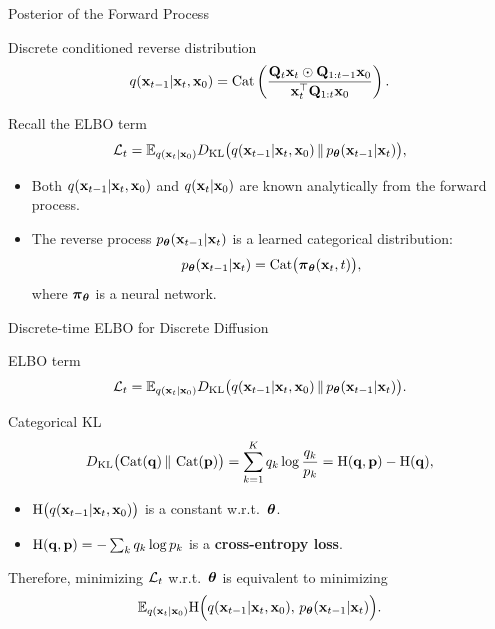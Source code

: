 \documentclass{beamer}
\begin{document}
\begin{frame}{Posterior of the Forward Process}
	\begin{block}{Discrete conditioned reverse distribution}
		\[
			q(\mathbf{x}_{t-1} | \mathbf{x}_t, \mathbf{x}_0)
			= \operatorname{Cat}\left(\frac{\mathbf{Q}_t \mathbf{x}_t \odot \mathbf{Q}_{1:t-1} \mathbf{x}_0}{\mathbf{x}_t^{\top}\mathbf{Q}_{1:t}\mathbf{x}_0}\right).
		\]
		\vspace{-0.3cm}
	\end{block}
	\eqpause
	Recall the ELBO term
	\[
		\mathcal{L}_t
		= \mathbb{E}_{q(\mathbf{x}_t | \mathbf{x}_0)}
		D_\mathrm{KL}\bigl(q(\mathbf{x}_{t-1} | \mathbf{x}_t, \mathbf{x}_0) \,\|\, p_{\boldsymbol{\theta}}(\mathbf{x}_{t-1} | \mathbf{x}_t)\bigr),
	\]
	\eqpause
	\vspace{-0.5cm}
	\begin{itemize}
		\item Both $q(\mathbf{x}_{t-1} | \mathbf{x}_t, \mathbf{x}_0)$ and $q(\mathbf{x}_t | \mathbf{x}_0)$ are known analytically from the forward process.
		\item The reverse process $p_{\boldsymbol{\theta}}(\mathbf{x}_{t-1} | \mathbf{x}_t)$ is a learned categorical distribution:
		\[
			p_{\boldsymbol{\theta}}(\mathbf{x}_{t-1} | \mathbf{x}_t) = \operatorname{Cat}\bigl( \boldsymbol{\pi}_{\boldsymbol{\theta}}(\mathbf{x}_t, t) \bigr),
		\]
		where $\boldsymbol{\pi}_{\boldsymbol{\theta}}$ is a neural network.
	\end{itemize}
\end{frame}
\begin{frame}{Discrete-time ELBO for Discrete Diffusion}

	\begin{block}{ELBO term}
		\vspace{-0.3cm}
		\[
			\mathcal{L}_t
			= \mathbb{E}_{q(\mathbf{x}_t | \mathbf{x}_0)}
			D_\mathrm{KL}\bigl(q(\mathbf{x}_{t-1} | \mathbf{x}_t, \mathbf{x}_0) \,\|\, p_{\boldsymbol{\theta}}(\mathbf{x}_{t-1} | \mathbf{x}_t)\bigr).
		\]
		\vspace{-0.3cm}
	\end{block}
	\eqpause
	\begin{block}{Categorical KL}
		\vspace{-0.3cm}
		\[
			D_\mathrm{KL}\bigl(\operatorname{Cat}(\mathbf{q}) \,\|\, \operatorname{Cat}(\mathbf{p})\bigr)
			= \sum_{k=1}^K q_k \log \frac{q_k}{p_k}
			= \mathrm{H}(\mathbf{q},\mathbf{p}) - \mathrm{H}(\mathbf{q}),
		\]
		\eqpause
		\begin{itemize}
			\item $\mathrm{H}\bigl(q(\mathbf{x}_{t-1} | \mathbf{x}_t, \mathbf{x}_0)\bigr)$ is a constant w.r.t.~$\boldsymbol{\theta}$.
			\item $\mathrm{H}(\mathbf{q},\mathbf{p}) = -\sum_k q_k \log p_k$ is a \textbf{cross-entropy loss}.
		\end{itemize}
	\end{block}
	\eqpause
	Therefore, minimizing $\mathcal{L}_t$ w.r.t.~$\boldsymbol{\theta}$ is equivalent to minimizing
	\[
		\mathbb{E}_{q(\mathbf{x}_t | \mathbf{x}_0)}
		\mathrm{H}\Bigl(q(\mathbf{x}_{t-1} | \mathbf{x}_t, \mathbf{x}_0),\, p_{\boldsymbol{\theta}}(\mathbf{x}_{t-1} | \mathbf{x}_t)\Bigr).
	\]
\end{frame}
\end{document}
